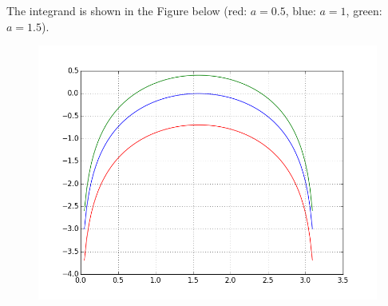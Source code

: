 The integrand is shown in the Figure below (red: \(a=0.5\), blue:
\(a=1\), green: \(a=1.5\)).

\begin{figure}[H]
\includegraphics[scale=0.7]{images/euler_log_sine.png}
\end{figure}
